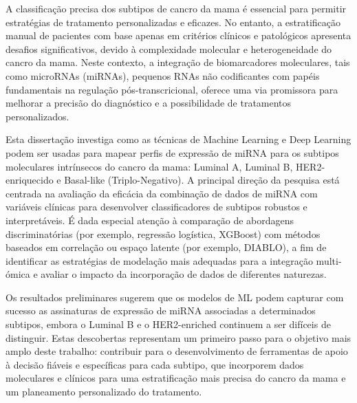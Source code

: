 
%

A classificação precisa dos subtipos de cancro da mama é essencial para
permitir estratégias de tratamento personalizadas e eficazes. No entanto, a
estratificação manual de pacientes com base apenas em critérios clínicos e
patológicos apresenta desafios significativos, devido à complexidade molecular
e heterogeneidade do cancro da mama. Neste contexto, a integração de
biomarcadores moleculares, tais como microRNAs (miRNAs), pequenos RNAs não
codificantes com papéis fundamentais na regulação pós-transcricional, oferece
uma via promissora para melhorar a precisão do diagnóstico e a possibilidade de
tratamentos personalizados.

Esta dissertação investiga como as técnicas de Machine Learning e Deep Learning
podem ser usadas para mapear perfis de expressão de miRNA para os subtipos
moleculares intrínsecos do cancro da mama: Luminal A, Luminal B,
HER2-enriquecido e Basal-like (Triplo-Negativo). A principal direção da
pesquisa está centrada na avaliação da eficácia da combinação de dados de miRNA
com variáveis clínicas para desenvolver classificadores de subtipos robustos e
interpretáveis. É dada especial atenção à comparação de abordagens
discriminatórias (por exemplo, regressão logística, XGBoost) com métodos
baseados em correlação ou espaço latente (por exemplo, DIABLO), a fim de
identificar as estratégias de modelação mais adequadas para a integração
multi-ómica e avaliar o impacto da incorporação de dados de diferentes naturezas.

Os resultados preliminares sugerem que os modelos de ML podem capturar com
sucesso as assinaturas de expressão de miRNA associadas a determinados
subtipos, embora o Luminal B e o HER2-enriched continuem a ser difíceis de
distinguir. Estas descobertas representam um primeiro passo para o objetivo
mais amplo deste trabalho: contribuir para o desenvolvimento de ferramentas de
apoio à decisão fiáveis e específicas para cada subtipo, que incorporem dados
moleculares e clínicos para uma estratificação mais precisa do cancro da mama e
um planeamento personalizado do tratamento.

